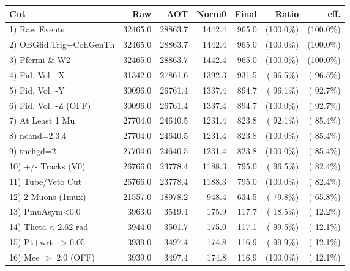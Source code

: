  \begin{table}[h!]\centering
 \begin{tabular}{||l||r|r|r|r|r|r||}
 \hline
 \hline
 Cut & Raw & AOT & Norm0 & Final & Ratio & eff.       \\
 \hline
  1) Raw Events           &      32465.0 &      28863.7 &       1442.4 &        965.0 & (100.0\%) & (100.0\%) \\
  2) OBGfid,Trig+CohGenTh &      32465.0 &      28863.7 &       1442.4 &        965.0 & (100.0\%) & (100.0\%) \\
  3) Pfermi \& W2         &      32465.0 &      28863.7 &       1442.4 &        965.0 & (100.0\%) & (100.0\%) \\
  4) Fid. Vol. -X         &      31342.0 &      27861.6 &       1392.3 &        931.5 & ( 96.5\%) & ( 96.5\%) \\
  5) Fid. Vol. -Y         &      30096.0 &      26761.4 &       1337.4 &        894.7 & ( 96.1\%) & ( 92.7\%) \\
  6) Fid. Vol. -Z (OFF)   &      30096.0 &      26761.4 &       1337.4 &        894.7 & (100.0\%) & ( 92.7\%) \\
  7) At Least 1 Mu        &      27704.0 &      24640.5 &       1231.4 &        823.8 & ( 92.1\%) & ( 85.4\%) \\
  8) ncand=2,3,4          &      27704.0 &      24640.5 &       1231.4 &        823.8 & (100.0\%) & ( 85.4\%) \\
  9) tnchgd=2             &      27704.0 &      24640.5 &       1231.4 &        823.8 & (100.0\%) & ( 85.4\%) \\
 10) +/- Tracks (V0)      &      26766.0 &      23778.4 &       1188.3 &        795.0 & ( 96.5\%) & ( 82.4\%) \\
 11) Tube/Veto Cut        &      26766.0 &      23778.4 &       1188.3 &        795.0 & (100.0\%) & ( 82.4\%) \\
 12) 2 Muons (1mux)       &      21557.0 &      18978.2 &        948.4 &        634.5 & ( 79.8\%) & ( 65.8\%) \\
 13) PmuAsym<0.0          &       3963.0 &       3519.4 &        175.9 &        117.7 & ( 18.5\%) & ( 12.2\%) \\
 14) Theta$<$2.62 rad     &       3944.0 &       3501.7 &        175.0 &        117.1 & ( 99.5\%) & ( 12.1\%) \\
 15) Pt+wrt- $>$0.05      &       3939.0 &       3497.4 &        174.8 &        116.9 & ( 99.9\%) & ( 12.1\%) \\
 16) Mee $>$ 2.0  (OFF)   &       3939.0 &       3497.4 &        174.8 &        116.9 & (100.0\%) & ( 12.1\%) \\

\end{tabular}
\end{table}
